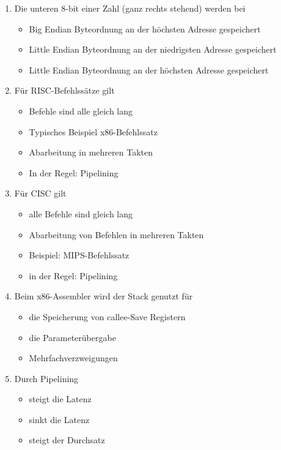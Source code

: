 \documentclass{exercisesheet}
\begin{document}
\begin{enumerate}
\begin{itemize}
        \end{itemize}
  \item Die unteren 8-bit einer Zahl (ganz rechts stehend) werden bei
        \begin{itemize}
          \item Big Endian Byteordnung an der höchsten Adresse gespeichert \checkmark
          \item Little Endian Byteordnung an der niedrigsten Adresse gespeichert \checkmark
          \item Little Endian Byteordnung an der höchsten Adresse gespeichert
        \end{itemize}
  \item Für RISC-Befehlssätze gilt
        \begin{itemize}
          \item Befehle sind alle gleich lang \checkmark
          \item Typisches Beispiel x86-Befehlssatz
          \item Abarbeitung in mehreren Takten \checkmark
          \item In der Regel: Pipelining \checkmark
        \end{itemize}
  \item Für CISC gilt
        \begin{itemize}
          \item alle Befehle sind gleich lang
          \item Abarbeitung von Befehlen in mehreren Takten \checkmark
          \item Beispiel: MIPS-Befehlssatz
          \item in der Regel: Pipelining
        \end{itemize}
  \item Beim x86-Assembler wird der Stack genutzt für
        \begin{itemize}
          \item die Speicherung von callee-Save Registern \checkmark
          \item die Parameterübergabe \checkmark
          \item Mehrfachverzweigungen
        \end{itemize}
  \item Durch Pipelining
        \begin{itemize}
          \item steigt die Latenz \checkmark
          \item sinkt die Latenz
          \item steigt der Durchsatz \checkmark

\end{itemize}
\end{enumerate}
\end{document}
